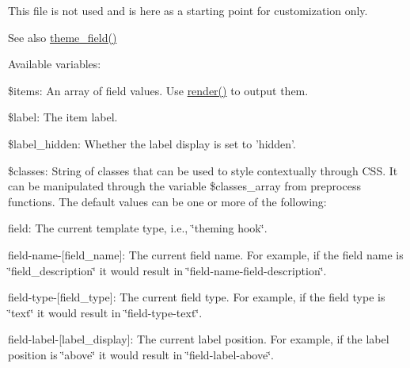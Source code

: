 This file is not used and is here as a starting point for customization only. \begin{DoxySeeAlso}{See also}
\hyperlink{group__themeable_gaee35966f09683ab054aef8f6fd022d2c}{theme\_\-field()}
\end{DoxySeeAlso}
Available variables:
\begin{DoxyItemize}
\item \$items: An array of field values. Use \hyperlink{common_8inc_a5f4b2009c1caf78549203cec9b324305}{render()} to output them.
\item \$label: The item label.
\item \$label\_\-hidden: Whether the label display is set to 'hidden'.
\item \$classes: String of classes that can be used to style contextually through CSS. It can be manipulated through the variable \$classes\_\-array from preprocess functions. The default values can be one or more of the following:
\begin{DoxyItemize}
\item field: The current template type, i.e., \char`\"{}theming hook\char`\"{}.
\item field-\/name-\/\mbox{[}field\_\-name\mbox{]}: The current field name. For example, if the field name is \char`\"{}field\_\-description\char`\"{} it would result in \char`\"{}field-\/name-\/field-\/description\char`\"{}.
\item field-\/type-\/\mbox{[}field\_\-type\mbox{]}: The current field type. For example, if the field type is \char`\"{}text\char`\"{} it would result in \char`\"{}field-\/type-\/text\char`\"{}.
\item field-\/label-\/\mbox{[}label\_\-display\mbox{]}: The current label position. For example, if the label position is \char`\"{}above\char`\"{} it would result in \char`\"{}field-\/label-\/above\char`\"{}.
\end{DoxyItemize}
\end{DoxyItemize}

